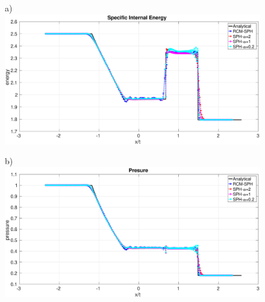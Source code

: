 \documentclass[review]{elsarticle}
\begin{document}
\begin{figure}[htp]
    \centering
    \begin{minipage}{.495\textwidth}
        \centering a)
        \includegraphics[width=0.99 \textwidth,height=0.7\textwidth]{./Figures/Sod/RCM-Sod-SPH-alf-e}
    \end{minipage}%
    \begin{minipage}{.495 \textwidth}
        \centering b)
        \includegraphics[width=0.99 \textwidth,height=0.7\textwidth]{./Figures/Sod/RCM-Sod-SPH-alf-p}

\end{minipage}
\end{figure}
\end{document}
